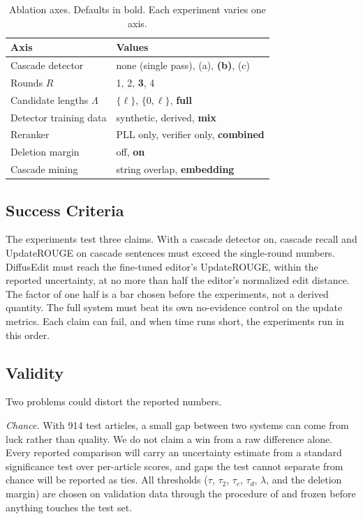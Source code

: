 \documentclass[]{paper}
\begin{document}
\begin{table}[t]
\caption{Ablation axes. Defaults in bold. Each experiment varies one axis.}
\label{tab:ablations}
\centering
\small
\begin{tabular}{ll}
\toprule
Axis & Values \\
\midrule
Cascade detector & none (single pass), (a), \textbf{(b)}, (c) \\
Rounds $R$ & 1, 2, \textbf{3}, 4 \\
Candidate lengths $\Lambda$ & $\{\ell\}$, $\{0, \ell\}$, \textbf{full} \\
Detector training data & synthetic, derived, \textbf{mix} \\
Reranker & PLL only, verifier only, \textbf{combined} \\
Deletion margin & off, \textbf{on} \\
Cascade mining & string overlap, \textbf{embedding} \\
\bottomrule
\end{tabular}
\end{table}

\subsection{Success Criteria}
\label{sec:success}

The experiments test three claims. With a cascade detector on, cascade recall and UpdateROUGE on cascade sentences must exceed the single-round numbers. DiffusEdit must reach the fine-tuned editor's UpdateROUGE, within the reported uncertainty, at no more than half the editor's normalized edit distance. The factor of one half is a bar chosen before the experiments, not a derived quantity. The full system must beat its own no-evidence control on the update metrics. Each claim can fail, and when time runs short, the experiments run in this order.

\subsection{Validity}
\label{sec:validity}

Two problems could distort the reported numbers.

\emph{Chance.} With 914 test articles, a small gap between two systems can come from luck rather than quality. We do not claim a win from a raw difference alone. Every reported comparison will carry an uncertainty estimate from a standard significance test over per-article scores, and gaps the test cannot separate from chance will be reported as ties. All thresholds ($\tau$, $\tau_2$, $\tau_c$, $\tau_d$, $\lambda$, and the deletion margin) are chosen on validation data through the procedure of  and frozen before anything touches the test set.
\end{document}
